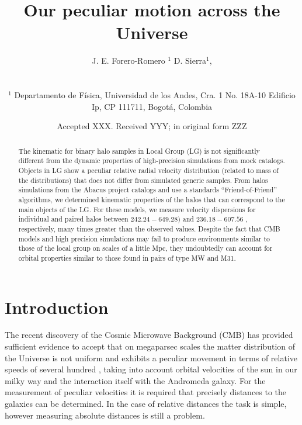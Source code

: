 \documentclass[usenatbib]{mnras}
\title[Our peculiar motion across the Universe]{Our peculiar motion across the Universe}
\author[Pe\~naranda-Rivera et al.]{
\parbox[t]{\textwidth}{
    {J. E. Forero-Romero $^{1}$}
    {D. Sierra$^{1}$,}
}
\\\\
$^{1}$ Departamento de F\'isica, Universidad de los Andes, Cra. 1
  No. 18A-10 Edificio Ip, CP 111711, Bogot\'a, Colombia \\
}
\date{Accepted XXX. Received YYY; in original form ZZZ}
\newcommand{\kms}{{\ifmmode{\ {\rm km\, {s}^{-1}}}\else{\ km s$^{-1}$}\fi}}
\begin{document}
\label{firstpage}
\pagerange{\pageref{firstpage}--\pageref{lastpage}}
\maketitle

\maketitle
\begin{abstract}
The kinematic for binary halo samples in Local Group (LG) is not significantly different from the dynamic properties of high-precision simulations from mock catalogs. Objects in LG show a peculiar relative radial velocity distribution (related to mass of the distributions) that does not differ from simulated generic samples. From halos simulations from the Abacus project catalogs and use a standards ``Friend-of-Friend'' algorithms, we determined kinematic properties of the halos that can correspond to the main objects of the LG. For these models, we measure velocity dispersions for individual and paired halos between $242.24-649.28)$ \kms and $236.18-607.56$ \kms, respectively, many times greater than the observed values. Despite the fact that CMB models and high precision simulations may fail to produce environments similar to those of the local group on scales of a little Mpc, they undoubtedly can account for orbital properties similar to those found in pairs of type MW and M31.   
\end{abstract}

\begin{keywords}
\end{keywords}



\section{Introduction}
The recent discovery of the Cosmic Microwave Background (CMB) has provided sufficient evidence to accept that on megaparsec scales the matter distribution of the Universe is not
uniform and exhibits a peculiar movement in terms of relative speeds of several hundred \kms, taking into account orbital velocities of the sun in our milky way and the interaction itself with the Andromeda galaxy. For the measurement of peculiar velocities it is required that precisely distances to the galaxies can be determined. In the case of relative distances the task is simple, however measuring absolute distances is still a problem.
\end{document}
